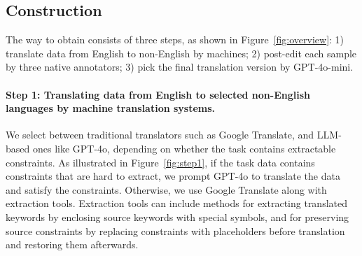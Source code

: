 


\subsection{Construction}
\label{sec:construction_process}
The way to obtain \name consists of three steps, as shown in Figure~\ref{fig:overview}: 1) translate data from English to non-English by machines; 2) post-edit each sample by three native annotators; 3) pick the final translation version by GPT-4o-mini.


\paragraph{Step 1: Translating data from English to selected non-English languages by machine translation systems.}
We select between traditional translators such as Google Translate, and LLM-based ones like GPT-4o, depending on whether the task contains extractable constraints.
As illustrated in Figure~\ref{fig:step1}, if the task data contains constraints that are hard to extract, we prompt GPT-4o to translate the data and satisfy the constraints.
Otherwise, we use Google Translate along with extraction tools.
Extraction tools can include methods for extracting translated keywords by enclosing source keywords with special symbols, and for preserving source constraints by replacing constraints with placeholders before translation and restoring them afterwards.


